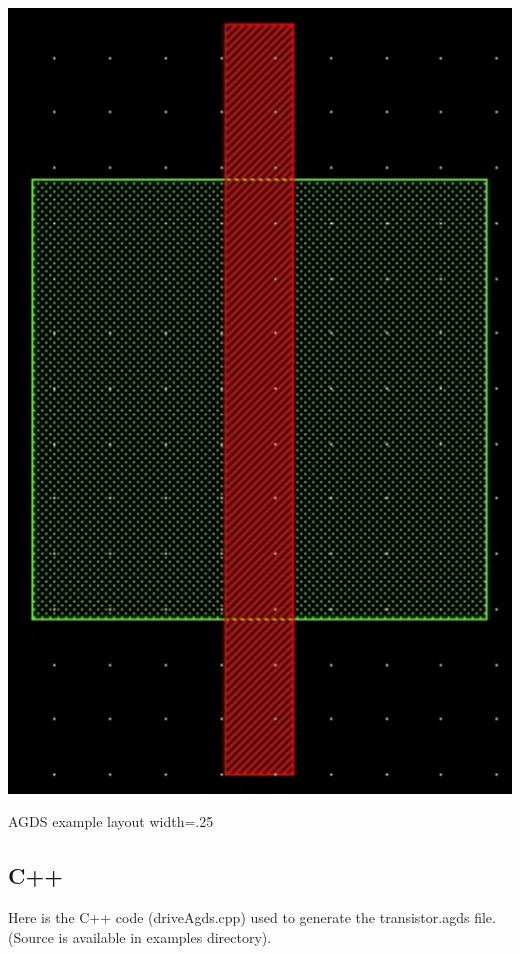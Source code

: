  
\begin{DoxyImage}
\includegraphics{transistorCif}
\caption{A\-G\-D\-S example layout width=.25}
\end{DoxyImage}
\hypertarget{agds_agdsC}{}\subsection{C++}\label{agds_agdsC}
Here is the C++ code ({\ttfamily drive\-Agds.\-cpp}) used to generate the transistor.\-agds file. (Source is available in examples directory). 
